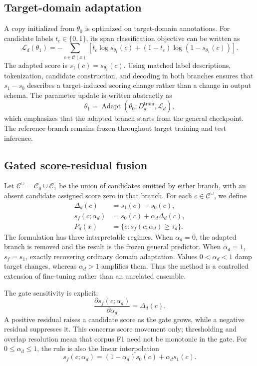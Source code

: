 \documentclass[a4paper,fleqn,numbers,doubleblind]{cas-dc}
\begin{document}
\subsection{Target-domain adaptation}
A copy initialized from $\theta_0$ is optimized on target-domain annotations. For candidate labels $t_c\in\{0,1\}$, its span classification objective can be written as
\begin{equation}
\mathcal{L}_{d}(\theta_1)=-\sum_{c\in\mathcal{C}(x)}
\left[t_c\log s_{\theta_1}(c)+(1-t_c)\log(1-s_{\theta_1}(c))\right].
\end{equation}
The adapted score is $s_1(c)=s_{\theta_1}(c)$. Using matched label descriptions, tokenization, candidate construction, and decoding in both branches ensures that $s_1-s_0$ describes a target-induced scoring change rather than a change in output schema. The parameter update is written abstractly as
\begin{equation}
\theta_1=\operatorname{Adapt}(\theta_0;D_d^{\mathrm{train}},\mathcal{L}_d),
\end{equation}
which emphasizes that the adapted branch starts from the general checkpoint. The reference branch remains frozen throughout target training and test inference.

\subsection{Gated score-residual fusion}
Let $\mathcal{C}^{\cup}=\mathcal{C}_0\cup\mathcal{C}_1$ be the union of candidates emitted by either branch, with an absent candidate assigned score zero in that branch. For each $c\in\mathcal{C}^{\cup}$, we define
\begin{align}
\Delta_d(c) &= s_1(c)-s_0(c),\\
s_f(c;\alpha_d) &= s_0(c)+\alpha_d\Delta_d(c),\\
P_d(x) &= \{c:s_f(c;\alpha_d)\geq\tau_d\}.
\end{align}
The formulation has three interpretable regimes. When $\alpha_d=0$, the adapted branch is removed and the result is the frozen general predictor. When $\alpha_d=1$, $s_f=s_1$, exactly recovering ordinary domain adaptation. Values $0<\alpha_d<1$ damp target changes, whereas $\alpha_d>1$ amplifies them. Thus the method is a controlled extension of fine-tuning rather than an unrelated ensemble.

The gate sensitivity is explicit:
\begin{equation}
\frac{\partial s_f(c;\alpha_d)}{\partial\alpha_d}=\Delta_d(c).
\end{equation}
A positive residual raises a candidate score as the gate grows, while a negative residual suppresses it. This concerns score movement only; thresholding and overlap resolution mean that corpus F1 need not be monotonic in the gate. For $0\leq\alpha_d\leq1$, the rule is also the linear interpolation
\begin{equation}
s_f(c;\alpha_d)=(1-\alpha_d)s_0(c)+\alpha_d s_1(c).
\end{equation}
\end{document}
